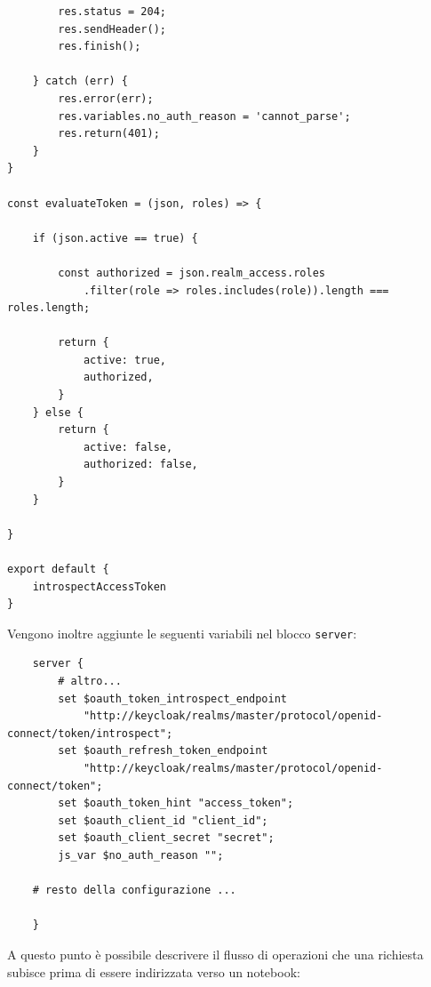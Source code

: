 \begin{verbatim}
        res.status = 204;
        res.sendHeader();
        res.finish();

    } catch (err) {
        res.error(err);
        res.variables.no_auth_reason = 'cannot_parse';
        res.return(401);
    }
}

const evaluateToken = (json, roles) => {

    if (json.active == true) {

        const authorized = json.realm_access.roles
            .filter(role => roles.includes(role)).length === roles.length;

        return {
            active: true,
            authorized,
        }
    } else {
        return {
            active: false,
            authorized: false,
        }
    }

}

export default {
    introspectAccessToken
}

\end{verbatim}
Vengono inoltre aggiunte le seguenti variabili nel blocco \verb|server|:
\begin{verbatim}
    server {
        # altro...
        set $oauth_token_introspect_endpoint 
            "http://keycloak/realms/master/protocol/openid-connect/token/introspect";
        set $oauth_refresh_token_endpoint 
            "http://keycloak/realms/master/protocol/openid-connect/token";
        set $oauth_token_hint "access_token"; 
        set $oauth_client_id "client_id";
        set $oauth_client_secret "secret";
        js_var $no_auth_reason "";

    # resto della configurazione ...
    
    }
\end{verbatim}
A questo punto è possibile descrivere il flusso di operazioni che una richiesta subisce prima di essere indirizzata verso un notebook:

